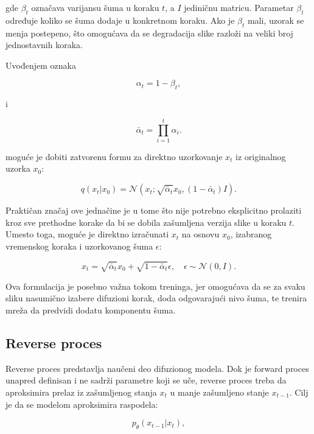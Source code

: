 \documentclass[10pt]{article}
\begin{document}
	gde $\beta_t$ označava varijansu šuma u koraku $t$, a $I$ jediničnu matricu. Parametar $\beta_t$ određuje koliko se šuma dodaje u konkretnom koraku. Ako je $\beta_t$ mali, uzorak se menja postepeno, što omogućava da se degradacija slike razloži na veliki broj jednostavnih koraka.
	
	Uvođenjem oznaka
	
	\begin{equation}
		\alpha_t = 1 - \beta_t,
	\end{equation}
	
	i
	
	\begin{equation}
		\bar{\alpha}_t = \prod_{i=1}^{t} \alpha_i.
	\end{equation}
	
	moguće je dobiti zatvorenu formu za direktno uzorkovanje $x_t$ iz originalnog uzorka $x_0$:
	
	\begin{equation}
		q(x_t|x_0) =
		\mathcal{N}(x_t; \sqrt{\bar{\alpha}_t}x_0, (1-\bar{\alpha}_t)I).
	\end{equation}
	
	Praktičan značaj ove jednačine je u tome što nije potrebno eksplicitno prolaziti kroz sve prethodne korake da bi se dobila zašumljena verzija slike u koraku $t$. Umesto toga, moguće je direktno izračunati $x_t$ na osnovu $x_0$, izabranog vremenskog koraka i uzorkovanog šuma $\epsilon$:
	
	\begin{equation}
		x_t = \sqrt{\bar{\alpha}_t}x_0 +
		\sqrt{1-\bar{\alpha}_t}\epsilon,
		\quad \epsilon \sim \mathcal{N}(0,I).
	\end{equation}
	
	Ova formulacija je posebno važna tokom treninga, jer omogućava da se za svaku sliku nasumično izabere difuzioni korak, doda odgovarajući nivo šuma, te trenira mreža da predvidi dodatu komponentu šuma.
	
	\subsection{Reverse proces}
	
	Reverse proces predstavlja naučeni deo difuzionog modela. Dok je forward proces unapred definisan i ne sadrži parametre koji se uče, reverse proces treba da aproksimira prelaz iz zašumljenog stanja $x_t$ u manje zašumljeno stanje $x_{t-1}$. Cilj je da se modelom aproksimira raspodela:
	
	\begin{equation}
		p_\theta(x_{t-1}|x_t),
	\end{equation}
	
\end{document}
